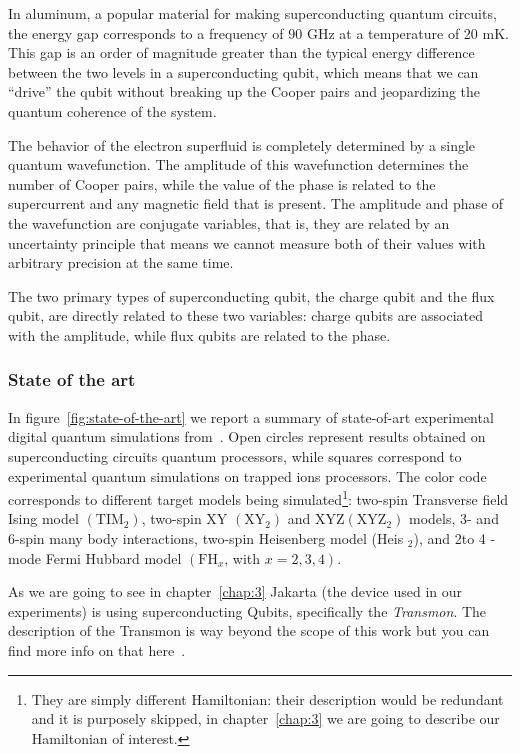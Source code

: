 In aluminum, a popular material for making superconducting quantum circuits, the energy gap corresponds to a frequency of 90 GHz at a temperature of 20 mK. This gap is an order of magnitude greater than the typical energy difference between the two levels in a superconducting qubit, which means that we can “drive” the qubit without breaking up the Cooper pairs and jeopardizing the quantum coherence of the system.

The behavior of the electron superfluid is completely determined by a single quantum wavefunction. The amplitude of this wavefunction determines the number of Cooper pairs, while the value of the phase is related to the supercurrent and any magnetic field that is present. The amplitude and phase of the wavefunction are conjugate variables, that is, they are related by an uncertainty principle that means we cannot measure both of their values with arbitrary precision at the same time. 

The two primary types of superconducting qubit, the charge qubit and the flux qubit, are directly related to these two variables: charge qubits are associated with the amplitude, while flux qubits are related to the phase. \cite{Supercon84:online}

\subsubsection*{State of the art}

In figure~\ref{fig:state-of-the-art} we report a summary of state-of-art experimental digital quantum simulations from~\cite{UQC}. Open circles represent results obtained on superconducting circuits quantum processors, while squares correspond to experimental quantum simulations on trapped ions processors. The color code corresponds to different target models being simulated\footnote{They are simply different Hamiltonian: their description would be redundant and it is purposely skipped, in chapter~\ref{chap:3} we are going to describe our Hamiltonian of interest.}: two-spin Transverse field Ising model $\left(\mathrm{TIM}_{2}\right)$, two-spin XY $\left(\mathrm{XY}_{2}\right)$ and $\mathrm{XYZ}\left(\mathrm{XYZ}_{2}\right)$ models, 3- and 6-spin many body interactions, two-spin Heisenberg model (Heis ${ }_{2}$), and 2to 4 -mode Fermi Hubbard model $\left(\mathrm{FH}_{x}\right.$, with $\left.x=2,3,4\right)$.

As we are going to see in chapter~\ref{chap:3} Jakarta (the device used in our experiments) is using superconducting Qubits, specifically the \emph{Transmon}. The description of the Transmon is way beyond the scope of this work but you can find more info on that here~\cite{Transmon}.

